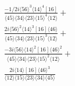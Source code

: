 \documentclass[varwidth, border=5pt]{standalone}
\begin{document}
\begin{my}
$\begin{gathered}
\scriptscriptstyle\frac{-1/2i\langle56\rangle^3\langle14\rangle^4[16]}{\langle45\rangle\langle34\rangle\langle23\rangle\langle15\rangle^4\langle12\rangle}+\\
\scriptscriptstyle\frac{2i\langle56\rangle^2\langle14\rangle^3[16]\langle46\rangle}{\langle45\rangle\langle34\rangle\langle23\rangle\langle15\rangle^3\langle12\rangle}+\\
\scriptscriptstyle\frac{-3i\langle56\rangle\langle14\rangle^2[16]\langle46\rangle^2}{\langle45\rangle\langle34\rangle\langle23\rangle\langle15\rangle^2\langle12\rangle}+\\
\scriptscriptstyle\frac{2i\langle14\rangle[16]\langle46\rangle^3}{\langle12\rangle\langle15\rangle\langle23\rangle\langle34\rangle\langle45\rangle}\phantom{+}
\end{gathered}$
\end{my}
\end{document}
